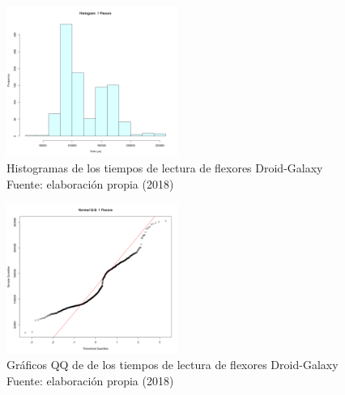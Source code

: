 \begin{figure}
 \begin{center} 
   	\includegraphics[width=0.5\textwidth]{evaluation/graphics/Droid/Galaxy/HistFlexorsDroidGalaxy.png} 
   	\captionsetup{justification=centering}
    \caption[Histogramas de los tiempos de lectura de flexores Droid-Galaxy]{Histogramas de los tiempos de lectura de flexores  Droid-Galaxy\\Fuente: elaboración propia (2018)} 
    \label{fig:droid-galaxy-hist-flexors}
  \end{center}
\end{figure}

\begin{figure}[H]
  \begin{center} 
   	\includegraphics[width=0.5\textwidth]{evaluation/graphics/Droid/Galaxy/NormalQQFlexorsDroidGalaxy.png} 
   	\captionsetup{justification=centering}
    \caption[Gráfico QQ de los tiempos de lectura de flexores Droid-Galaxy]{Gráficos QQ de de los tiempos de lectura de flexores Droid-Galaxy\\Fuente: elaboración propia (2018)} 
    \label{fig:droid-galaxy-QQ-flexors}
  \end{center}
\end{figure}

